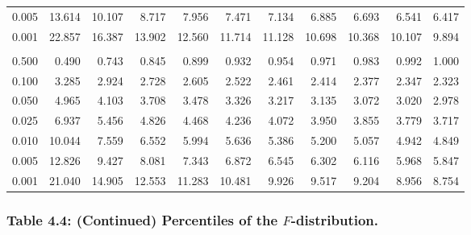 \documentclass[
]{article}
\begin{document}
\begin{longtable}[t]{lrrrrrrrrrr}
\hspace{1em}0.005 & 13.614 & 10.107 & 8.717 & 7.956 & 7.471 & 7.134 & 6.885 & 6.693 & 6.541 & 6.417\\
\hspace{1em}0.001 & 22.857 & 16.387 & 13.902 & 12.560 & 11.714 & 11.128 & 10.698 & 10.368 & 10.107 & 9.894\\
\addlinespace[0.3em]
\multicolumn{11}{l}{\textbf{$k_2=10$}}\\
\hspace{1em}0.500 & 0.490 & 0.743 & 0.845 & 0.899 & 0.932 & 0.954 & 0.971 & 0.983 & 0.992 & 1.000\\
\hspace{1em}0.100 & 3.285 & 2.924 & 2.728 & 2.605 & 2.522 & 2.461 & 2.414 & 2.377 & 2.347 & 2.323\\
\hspace{1em}0.050 & 4.965 & 4.103 & 3.708 & 3.478 & 3.326 & 3.217 & 3.135 & 3.072 & 3.020 & 2.978\\
\hspace{1em}0.025 & 6.937 & 5.456 & 4.826 & 4.468 & 4.236 & 4.072 & 3.950 & 3.855 & 3.779 & 3.717\\
\hspace{1em}0.010 & 10.044 & 7.559 & 6.552 & 5.994 & 5.636 & 5.386 & 5.200 & 5.057 & 4.942 & 4.849\\
\hspace{1em}0.005 & 12.826 & 9.427 & 8.081 & 7.343 & 6.872 & 6.545 & 6.302 & 6.116 & 5.968 & 5.847\\
\hspace{1em}0.001 & 21.040 & 14.905 & 12.553 & 11.283 & 10.481 & 9.926 & 9.517 & 9.204 & 8.956 & 8.754\\
\bottomrule
\end{longtable}

\newpage

\subsubsection{\texorpdfstring{Table 4.4: (Continued) Percentiles of the
\(F\)-distribution.}{Table 4.4: (Continued) Percentiles of the F-distribution.}}\label{table-4.4-continued-percentiles-of-the-f-distribution.}
\end{document}
